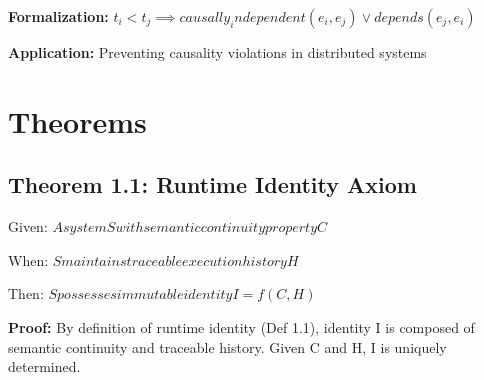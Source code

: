 \documentclass[11pt]{article}
\begin{document}
\textbf{Formalization:} $t_i < t_j ⟹ causally_independent(e_i, e_j) ∨ depends(e_j, e_i)$

\textbf{Application:} Preventing causality violations in distributed systems

\section{Theorems}

\subsection{Theorem 1.1: Runtime Identity Axiom}
Given: $A system S with semantic continuity property C$

When: $S maintains traceable execution history H$

Then: $S possesses immutable identity I = f(C, H)$

\textbf{Proof:} By definition of runtime identity (Def 1.1), identity I is composed of semantic continuity and traceable history. Given C and H, I is uniquely determined.
\end{document}
